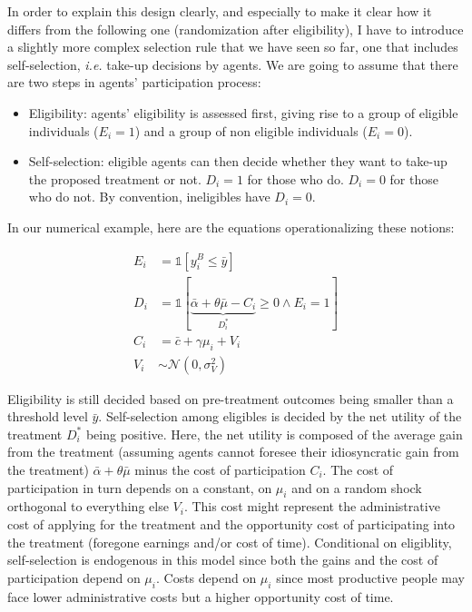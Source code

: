 \documentclass[]{book}
\providecommand{\tightlist}{%
  \setlength{\itemsep}{0pt}\setlength{\parskip}{0pt}}
\newcommand{\uns}[1]{\mathds{1}[ #1 ]}
\theoremstyle{definition}
\theoremstyle{definition}
\theoremstyle{definition}
\theoremstyle{remark}
\let\BeginKnitrBlock\begin \let\EndKnitrBlock\end
\begin{document}
In order to explain this design clearly, and especially to make it clear how it differs from the following one (randomization after eligibility), I have to introduce a slightly more complex selection rule that we have seen so far, one that includes self-selection, \textit{i.e.} take-up decisions by agents.
We are going to assume that there are two steps in agents' participation process:

\begin{itemize}
\tightlist
\item
  Eligibility: agents' eligibility is assessed first, giving rise to a group of eligible individuals (\(E_i=1\)) and a group of non eligible individuals (\(E_i=0\)).
\item
  Self-selection: eligible agents can then decide whether they want to take-up the proposed treatment or not.
  \(D_i=1\) for those who do.
  \(D_i=0\) for those who do not.
  By convention, ineligibles have \(D_i=0\).
\end{itemize}

\BeginKnitrBlock{example}
\protect\hypertarget{exm:unnamed-chunk-78}{}{\label{exm:unnamed-chunk-78} }In our numerical example, here are the equations operationalizing these notions:
\EndKnitrBlock{example}

\begin{align*}
E_i & = \uns{y_i^B\leq\bar{y}} \\
D_i & = \uns{\underbrace{\bar{\alpha}+\theta\bar{\mu}-C_i}_{D_i^*}\geq0 \land E_i=1} \\
C_i & = \bar{c} + \gamma \mu_i + V_i\\
V_i & \sim \mathcal{N}(0,\sigma^2_V)
\end{align*}

Eligibility is still decided based on pre-treatment outcomes being smaller than a threshold level \(\bar{y}\).
Self-selection among eligibles is decided by the net utility of the treatment \(D_i^*\) being positive.
Here, the net utility is composed of the average gain from the treatment (assuming agents cannot foresee their idiosyncratic gain from the treatment) \(\bar{\alpha}+\theta\bar{\mu}\) minus the cost of participation \(C_i\).
The cost of participation in turn depends on a constant, on \(\mu_i\) and on a random shock orthogonal to everything else \(V_i\).
This cost might represent the administrative cost of applying for the treatment and the opportunity cost of participating into the treatment (foregone earnings and/or cost of time).
Conditional on eligiblity, self-selection is endogenous in this model since both the gains and the cost of participation depend on \(\mu_i\).
Costs depend on \(\mu_i\) since most productive people may face lower administrative costs but a higher opportunity cost of time.
\end{document}
